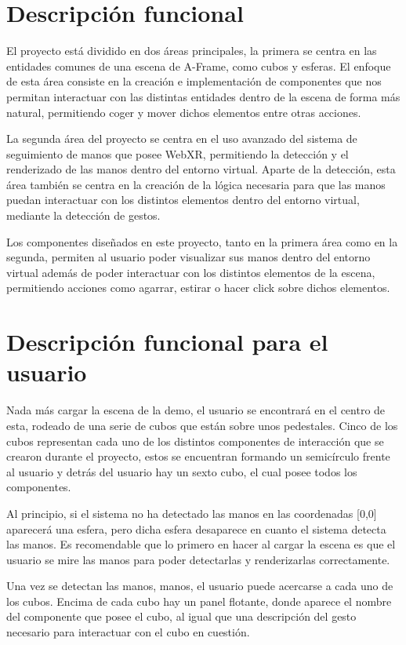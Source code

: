 \documentclass[a4paper, 12pt]{book}
\begin{document}
\section{Descripción funcional}
\label{sec:descripcion-funcional}
El proyecto está dividido en dos áreas principales, la primera se centra en las entidades comunes de una escena de A-Frame, como cubos y esferas. El enfoque de esta área consiste en la creación e implementación de componentes que nos permitan interactuar con las distintas entidades dentro de la escena de forma más natural, permitiendo coger y mover dichos elementos entre otras acciones.

La segunda área del proyecto se centra en el uso avanzado del sistema de seguimiento de manos que posee WebXR, permitiendo la detección y el renderizado de las manos dentro del entorno virtual. Aparte de la detección, esta área también se centra en la creación de la lógica necesaria para que las manos puedan interactuar con los distintos elementos dentro del entorno virtual, mediante la detección de gestos.

Los componentes diseñados en este proyecto, tanto en la primera área como en la segunda, permiten al usuario poder visualizar sus manos dentro del entorno virtual además de poder interactuar con los distintos elementos de la escena, permitiendo acciones como agarrar, estirar o hacer click sobre dichos elementos. 

\section{Descripción funcional para el usuario}
\label{sec:manual-usuario}
Nada más cargar la escena de la demo, el usuario se encontrará en el centro de esta, rodeado de una serie de cubos que están sobre unos pedestales. Cinco de los cubos representan cada uno de los distintos componentes de interacción que se crearon durante el proyecto, estos se encuentran formando un semicírculo frente al usuario y detrás del usuario hay un sexto cubo, el cual posee todos los componentes.

Al principio, si el sistema no ha detectado las manos en las coordenadas [0,0] aparecerá una esfera, pero dicha esfera desaparece en cuanto el sistema detecta las manos. Es recomendable que lo primero en hacer al cargar la escena es que el usuario se mire las manos para poder detectarlas y renderizarlas correctamente. 

Una vez se detectan las manos, manos, el usuario puede acercarse a cada uno de los cubos. Encima de cada cubo hay un panel flotante, donde aparece el nombre del componente que posee el cubo, al igual que una descripción del gesto necesario para interactuar con el cubo en cuestión. 
\end{document}
